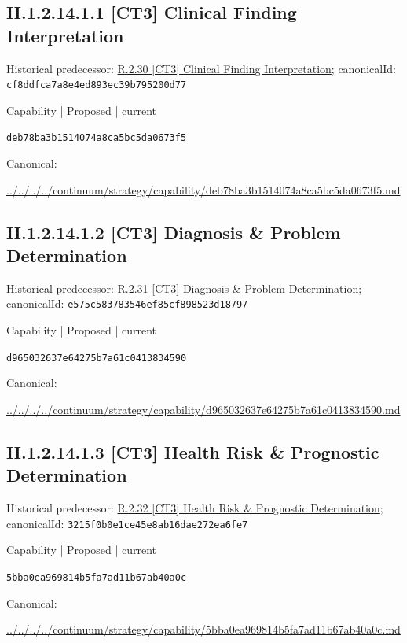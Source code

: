 \documentclass[10pt,a4paper]{article}
\begin{document}
\subsection*{II.1.2.14.1.1 [CT3] Clinical Finding Interpretation}
Historical predecessor: \hyperref[element-cf8ddfca7a8e4ed893ec39b795200d77]{R.2.30 [CT3] Clinical Finding Interpretation}; canonicalId: \texttt{cf8ddfca7a8e4ed893ec39b795200d77}\par
\label{element-deb78ba3b1514074a8ca5bc5da0673f5}
{\small Capability | Proposed | current}\par
\texttt{deb78ba3b1514074a8ca5bc5da0673f5}\par
Canonical: \par
{\footnotesize\url{../../../../continuum/strategy/capability/deb78ba3b1514074a8ca5bc5da0673f5.md}}\par
\subsection*{II.1.2.14.1.2 [CT3] Diagnosis \& Problem Determination}
Historical predecessor: \hyperref[element-e575c583783546ef85cf898523d18797]{R.2.31 [CT3] Diagnosis \& Problem Determination}; canonicalId: \texttt{e575c583783546ef85cf898523d18797}\par
\label{element-d965032637e64275b7a61c0413834590}
{\small Capability | Proposed | current}\par
\texttt{d965032637e64275b7a61c0413834590}\par
Canonical: \par
{\footnotesize\url{../../../../continuum/strategy/capability/d965032637e64275b7a61c0413834590.md}}\par
\subsection*{II.1.2.14.1.3 [CT3] Health Risk \& Prognostic Determination}
Historical predecessor: \hyperref[element-3215f0b0e1ce45e8ab16dae272ea6fe7]{R.2.32 [CT3] Health Risk \& Prognostic Determination}; canonicalId: \texttt{3215f0b0e1ce45e8ab16dae272ea6fe7}\par
\label{element-5bba0ea969814b5fa7ad11b67ab40a0c}
{\small Capability | Proposed | current}\par
\texttt{5bba0ea969814b5fa7ad11b67ab40a0c}\par
Canonical: \par
{\footnotesize\url{../../../../continuum/strategy/capability/5bba0ea969814b5fa7ad11b67ab40a0c.md}}\par
\end{document}
